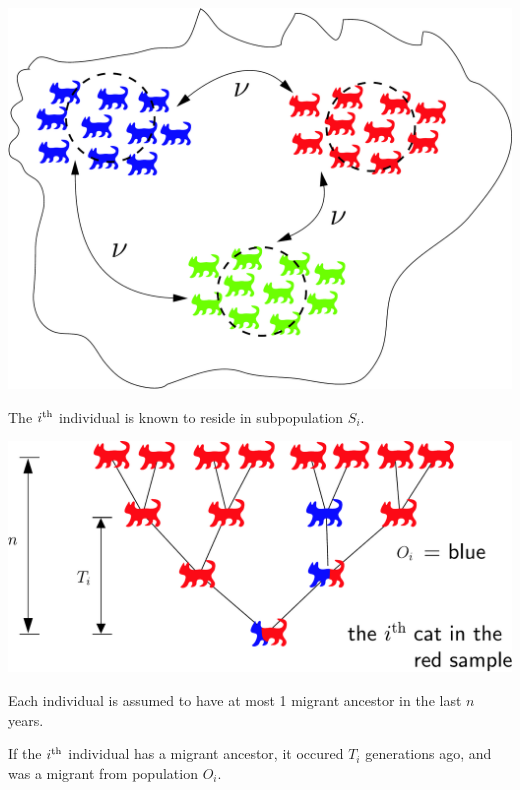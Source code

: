 \vspace*{-.4in}
\begin{center}
\includegraphics*[width=.85\textwidth]{illus/prior_popinfo_cats_nu.pdf}
\end{center}
\vspace*{-.3in}
The $i^\mathrm{th}$ individual is known to reside in subpopulation $S_i$.


\begin{center}
\includegraphics*[width=.85\textwidth]{illus/immig_anc.pdf}
\end{center}
Each individual is assumed to have at most 1 migrant ancestor in the last $n$ years.

If the $i^\mathrm{th}$ individual has a migrant ancestor, it occured $T_i$ generations ago, and was a migrant from population $O_i$.




